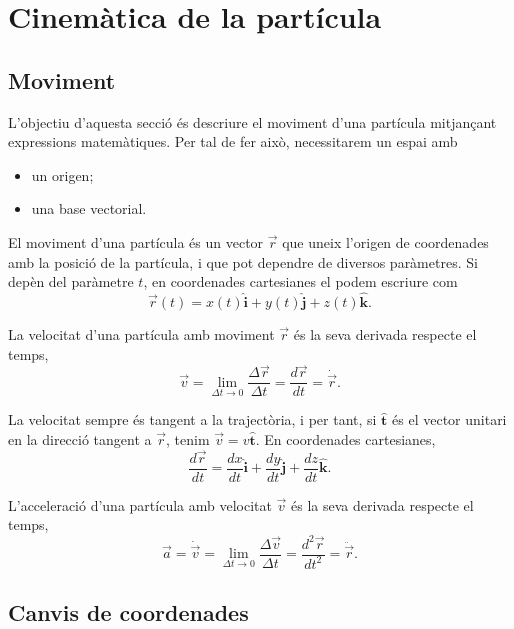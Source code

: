 \chapter{Cinemàtica de la partícula}

\section{Moviment}
L'objectiu d'aquesta secció és descriure el moviment d'una partícula mitjançant expressions matemàtiques. Per tal de fer això, necessitarem un espai amb
\begin{itemize}
	\item un origen;
	\item una base vectorial.
\end{itemize}
\begin{defi}[Moviment]
    El moviment d'una partícula és un vector $\vec{r}$ que uneix l'origen de coordenades amb la posició de la partícula, i que pot dependre de diversos paràmetres. Si depèn del paràmetre $t$, en coordenades cartesianes el podem escriure com
    \[
    \vec{r}(t)=x(t)\hat{\mathbf{i}}+y(t)\hat{\mathbf{j}}+z(t)\hat{\mathbf{k}}.
    \]
\end{defi}
\begin{defi}[Velocitat]
	La velocitat d'una partícula amb moviment $\vec{r}$ és la seva derivada respecte el temps,
	\[
	\vec{v}=\lim_{\Delta t\rightarrow 0}\dfrac{\Delta\vec{r}}{\Delta t}=\dfrac{d\vec{r}}{dt}=\dot{\vec{r}}.
	\]
\end{defi}
La velocitat sempre és tangent a la trajectòria, i per tant, si $\hat{\mathbf{t}}$ és el vector unitari en la direcció tangent a $\vec{r}$, tenim $\vec{v}=v\hat{\mathbf{t}}$. En coordenades cartesianes,
\[
\dfrac{d\vec{r}}{dt}=\dfrac{dx}{dt}\hat{\mathbf{i}}+\dfrac{dy}{dt}\hat{\mathbf{j}}+\dfrac{dz}{dt}\hat{\mathbf{k}}.
\]
\begin{defi}[Acceleració]
	L'acceleració d'una partícula amb velocitat $\vec{v}$ és la seva derivada respecte el temps,
	\[
	\vec{a}=\dot{\vec{v}}=\lim_{\Delta t\rightarrow 0}\dfrac{\Delta\vec{v}}{\Delta t}=\dfrac{d^2\vec{r}}{dt^2}=\ddot{\vec{r}}.
	\]
\end{defi}
\newpage

\section{Canvis de coordenades}
